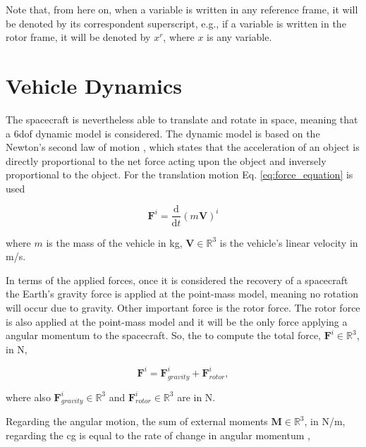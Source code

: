 Note that, from here on, when a variable is written in any reference frame, it will be denoted by its correspondent superscript, e.g., if a variable is written in the rotor frame, it will be denoted by $x^r$, where $x$ is any variable.


\section{Vehicle Dynamics}
\label{section:vehicle_dynamics}

The spacecraft is nevertheless able to translate and rotate in space, meaning that a \gls{6dof} dynamic model is considered. The dynamic model is based on the Newton's second law of motion \cite{soler_fundamentals_2014,vepa_flight_2023}, which states that the acceleration of an object is directly proportional to the net force acting upon the object and inversely proportional to the object. For the translation motion Eq. \ref {eq:force_equation} is used

\begin{equation}
    \mathbf{F}^i = \frac{\mathrm{d}}{\mathrm{d}t} \left( m \mathbf{V} \right)^i
    \label{eq:force_equation}
\end{equation}

\noindent where $m$ is the mass of the vehicle in \unit{kg}, $\mathbf{V} \in \mathbb{R}^3$ is the vehicle’s linear velocity in \unit{m/s}. 

In terms of the applied forces, once it is considered the recovery of a spacecraft the Earth's gravity force is applied at the point-mass model, meaning no rotation will occur due to gravity. Other important force is the rotor force. The rotor force is also applied at the point-mass model and it will be the only force applying a angular momentum to the spacecraft. So, the to compute the total force, $\mathbf{F}^i \in \mathbb{R}^3$, in \unit{N}, 

\begin{equation}
    \mathbf{F}^i = \mathbf{F}_{gravity}^i + \mathbf{F}_{rotor}^i,
\end{equation}

\noindent where also $\mathbf{F}_{gravity}^i \in \mathbb{R}^3$ and $\mathbf{F}_{rotor}^i \in \mathbb{R}^3$ are in \unit{N}.

Regarding the angular motion, the sum of external moments $\mathbf{M} \in \mathbb{R}^3$, in \unit{N/m}, regarding the \gls{cg} is equal to the rate of change in angular momentum \cite{soler_fundamentals_2014,vepa_flight_2023},

